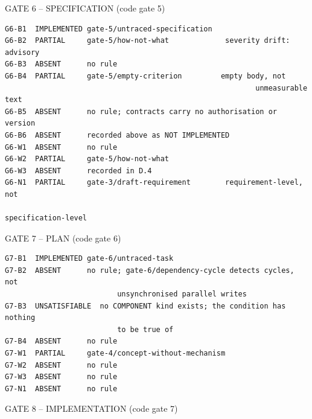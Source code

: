 \documentclass[11pt,a4paper]{article}
\begin{document}
GATE 6 -- SPECIFICATION (code gate 5)

\begin{Verbatim}[fontsize=\footnotesize,breaklines=true,breakanywhere=true,breakautoindent=false,samepage=false]
G6-B1  IMPLEMENTED gate-5/untraced-specification
G6-B2  PARTIAL     gate-5/how-not-what             severity drift: advisory
G6-B3  ABSENT      no rule
G6-B4  PARTIAL     gate-5/empty-criterion         empty body, not
                                                          unmeasurable text
G6-B5  ABSENT      no rule; contracts carry no authorisation or version
G6-B6  ABSENT      recorded above as NOT IMPLEMENTED
G6-W1  ABSENT      no rule
G6-W2  PARTIAL     gate-5/how-not-what
G6-W3  ABSENT      recorded in D.4
G6-N1  PARTIAL     gate-3/draft-requirement        requirement-level, not
                                                          specification-level
\end{Verbatim}

GATE 7 -- PLAN (code gate 6)

\begin{Verbatim}[fontsize=\footnotesize,breaklines=true,breakanywhere=true,breakautoindent=false,samepage=false]
G7-B1  IMPLEMENTED gate-6/untraced-task
G7-B2  ABSENT      no rule; gate-6/dependency-cycle detects cycles, not
                          unsynchronised parallel writes
G7-B3  UNSATISFIABLE  no COMPONENT kind exists; the condition has nothing
                          to be true of
G7-B4  ABSENT      no rule
G7-W1  PARTIAL     gate-4/concept-without-mechanism
G7-W2  ABSENT      no rule
G7-W3  ABSENT      no rule
G7-N1  ABSENT      no rule
\end{Verbatim}

GATE 8 -- IMPLEMENTATION (code gate 7)
\end{document}
